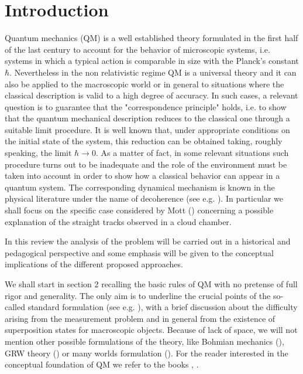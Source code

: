 \documentclass[12pt,reqno]{amsart}
\newcommand{\n}{\relax}
\newcommand{\vs}{\medskip}
\numberwithin{equation}{section}
\begin{document}
\vs
\vs

\section{Introduction }


\vs
\n
Quantum mechanics (QM) is a well established theory formulated in the first half of the last century to account for the behavior of microscopic systems, i.e. systems in which a typical action is comparable in size with the Planck's constant $\hbar$. Nevertheless in the non relativistic regime QM is a universal theory  and it can also be applied to the macroscopic world or in general to situations where the classical description is valid to a high degree of accuracy. 
In such cases, a relevant question is to guarantee that the "correspondence principle" holds, i.e.   to show that the quantum mechanical description reduces to the classical one through a suitable limit procedure. It is well known that,  under appropriate conditions on the initial state of the system, this reduction can be obtained taking, roughly speaking,  the limit $\hbar \rightarrow 0$. 
As a matter of fact, in some relevant situations such procedure turns out to be inadequate and the role of the environment  
must be taken into account in order to show how  a classical behavior can appear in  a quantum system. The corresponding   dynamical mechanism is known in the physical literature under the name of decoherence (see e.g. \cite{gjkksz}). In particular we shall focus on the specific case considered by Mott (\cite{m}) concerning a possible explanation of the straight tracks observed in a cloud chamber.

\n
In this review the analysis of the problem will be carried out in a historical and pedagogical perspective and some emphasis will be given to the conceptual implications of the different proposed approaches.

\n
We shall start in section 2 recalling the basic rules of QM with no pretense of full rigor and generality. The only aim is to underline the crucial points of the so-called standard formulation (see e.g. \cite{s}), with a brief discussion about the difficulty arising from the measurement problem and in general from the existence of superposition states for macroscopic objects. 
Because of lack of space, we will not mention  other possible formulations of the theory, like Bohmian mechanics (\cite{dgz}),  GRW theory (\cite{grw}) or  many worlds formulation (\cite{e}). For the reader interested in the conceptual foundation of QM we refer to the books \cite{b}, \cite{g}.
\end{document}
